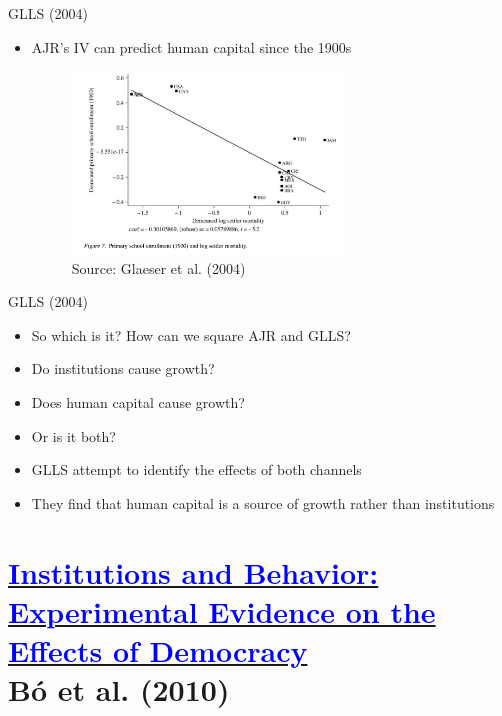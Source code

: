 \documentclass[11pt,notes=hide,aspectratio=169,mathserif]{beamer}
\begin{document}
\begin{frame}{GLLS (2004)}
\begin{itemize}
\item AJR's IV can predict human capital since the 1900s
\begin{figure}
\centering
\includegraphics[width=0.68\textwidth]{inputs/GLLS1.png}
\caption{Source: Glaeser et al. (2004)}
\end{figure}
\end{itemize}
\end{frame}

\begin{frame}{GLLS (2004)}
\begin{itemize}
\item So which is it? How can we square AJR and GLLS?
\item Do institutions cause growth? 
\item Does human capital cause growth?
\item Or is it both?
\item GLLS attempt to identify the effects of both channels 
\item They find that human capital is a source of growth rather than institutions
\end{itemize}
\end{frame}

\section*{\href{https://pubs.aeaweb.org/doi/pdfplus/10.1257/aer.100.5.2205}{\textcolor{blue}{Institutions and Behavior: Experimental Evidence on the Effects of Democracy}} \\ Bó et al. (2010)}
\end{document}
